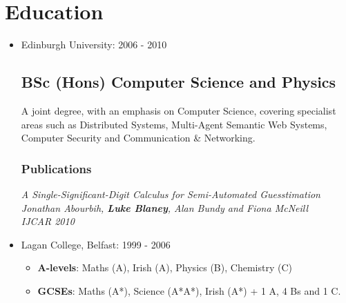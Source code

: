 \documentclass[a4paper]{article}
\newenvironment{detail}{\begin{adjustwidth}{10pt}{}}{\end{adjustwidth}}
\begin{document}
\section*{Education}
\begin{itemize}

\item Edinburgh University: 2006 - 2010
\subsection*{BSc (Hons) Computer Science and Physics}
\begin{detail}
A joint degree, with an emphasis on Computer Science, covering specialist areas such as Distributed Systems, Multi-Agent Semantic Web Systems, Computer Security and Communication \& Networking.
\subsubsection*{Publications}
\em A Single-Significant-Digit Calculus for Semi-Automated Guesstimation \em\\
Jonathan Abourbih, {\bf Luke Blaney}, Alan Bundy and Fiona McNeill\\
IJCAR 2010
\end{detail}

\item Lagan College, Belfast: 1999 - 2006
\begin{itemize}\item {\bf A-levels}: Maths (A), Irish (A), Physics (B), Chemistry (C)
\item {\bf GCSEs}: Maths (A*), Science (A*A*), Irish (A*) + 1 A, 4 Bs and 1 C.
\end{itemize}

\end{itemize}
\end{document}
